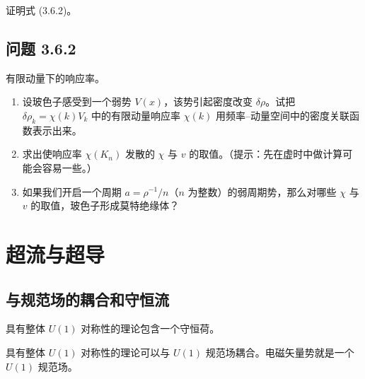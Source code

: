 证明式 (3.6.2)。

\subsection*{问题 3.6.2}

有限动量下的响应率。
\begin{enumerate}
\item 设玻色子感受到一个弱势 $V(x)$，该势引起密度改变 $\delta\rho$。试把 $\delta\rho_k=\chi(k)V_k$ 中的有限动量响应率 $\chi(k)$ 用频率--动量空间中的密度关联函数表示出来。
\item 求出使响应率 $\chi(K_n)$ 发散的 $\chi$ 与 $v$ 的取值。（提示：先在虚时中做计算可能会容易一些。）
\item 如果我们开启一个周期 $a=\rho^{-1}/n$（$n$ 为整数）的弱周期势，那么对哪些 $\chi$ 与 $v$ 的取值，玻色子形成莫特绝缘体？
\end{enumerate}

\section{超流与超导}

\subsection{与规范场的耦合和守恒流}

\begin{keypoints}
\item 具有整体 $U(1)$ 对称性的理论包含一个守恒荷。
\item 具有整体 $U(1)$ 对称性的理论可以与 $U(1)$ 规范场耦合。电磁矢量势就是一个 $U(1)$ 规范场。
\end{keypoints}

